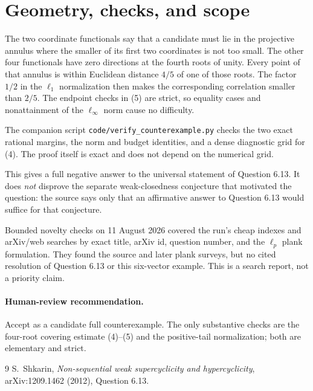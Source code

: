 \documentclass[11pt]{article}
\begin{document}
\section{Geometry, checks, and scope}

The two coordinate functionals say that a candidate must lie in the
projective annulus where the smaller of its first two coordinates is not too
small.  The other four functionals have zero directions at the fourth roots
of unity.  Every point of that annulus is within Euclidean distance $4/5$
of one of those roots.  The factor $1/2$ in the $\ell_1$ normalization then
makes the corresponding correlation smaller than $2/5$.  The endpoint
checks in (5) are strict, so equality cases and nonattainment of the
$\ell_\infty$ norm cause no difficulty.

The companion script \texttt{code/verify\_counterexample.py} checks the two
exact rational margins, the norm and budget identities, and a dense
diagnostic grid for (4).  The proof itself is exact and does not depend on
the numerical grid.

This gives a full negative answer to the universal statement of Question
6.13.  It does \emph{not} disprove the separate weak-closedness conjecture
that motivated the question: the source says only that an affirmative answer
to Question 6.13 would suffice for that conjecture.

Bounded novelty checks on 11 August 2026 covered the run's cheap indexes and
arXiv/web searches by exact title, arXiv id, question number, and the
$\ell_p$ plank formulation.  They found the source and later plank surveys,
but no cited resolution of Question 6.13 or this six-vector example.  This
is a search report, not a priority claim.

\paragraph{Human-review recommendation.}
Accept as a candidate full counterexample.  The only substantive checks are
the four-root covering estimate (4)--(5) and the positive-tail normalization;
both are elementary and strict.

\begin{thebibliography}{9}
S.~Shkarin,
\emph{Non-sequential weak supercyclicity and hypercyclicity},
arXiv:1209.1462 (2012), Question 6.13.
\end{thebibliography}
\end{document}
